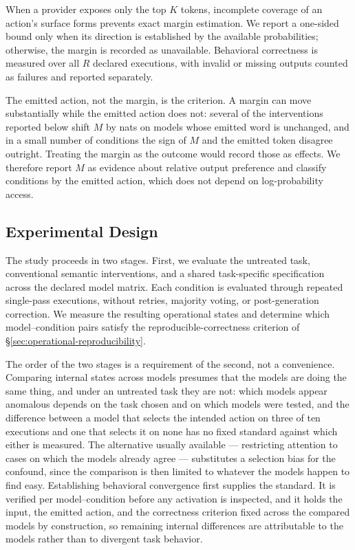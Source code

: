 When a provider exposes only the top $K$ tokens, incomplete coverage
of an action's surface forms prevents exact margin estimation. We
report a one-sided bound only when its direction is established by
the available probabilities; otherwise, the margin is recorded as
unavailable. Behavioral correctness is measured over all $R$ declared
executions, with invalid or missing outputs counted as failures and
reported separately.

The emitted action, not the margin, is the criterion. A margin can move
substantially while the emitted action does not: several of the interventions
reported below shift $M$ by nats on models whose emitted word is unchanged, and in
a small number of conditions the sign of $M$ and the emitted token disagree
outright. Treating the margin as the outcome would record those as effects. We
therefore report $M$ as evidence about relative output preference and classify
conditions by the emitted action, which does not depend on log-probability access.

\subsection{Experimental Design}
\label{sec:experimental-design}

The study proceeds in two stages. First, we evaluate the untreated
task, conventional semantic interventions, and a shared task-specific
specification across the declared model matrix. Each condition is
evaluated through repeated single-pass executions, without retries,
majority voting, or post-generation correction. We measure the
resulting operational states and determine which model--condition
pairs satisfy the reproducible-correctness criterion of
\S\ref{sec:operational-reproducibility}.

The order of the two stages is a requirement of the second, not a convenience.
Comparing internal states across models presumes that the models are doing the same
thing, and under an untreated task they are not: which models appear anomalous
depends on the task chosen and on which models were tested, and the difference
between a model that selects the intended action on three of ten executions and one
that selects it on none has no fixed standard against which either is measured. The
alternative usually available --- restricting attention to cases on which the models
already agree --- substitutes a selection bias for the confound, since the comparison
is then limited to whatever the models happen to find easy. Establishing behavioral
convergence first supplies the standard. It is verified per model--condition before
any activation is inspected, and it holds the input, the emitted action, and the
correctness criterion fixed across the compared models by construction, so remaining
internal differences are attributable to the models rather than to divergent task
behavior.

